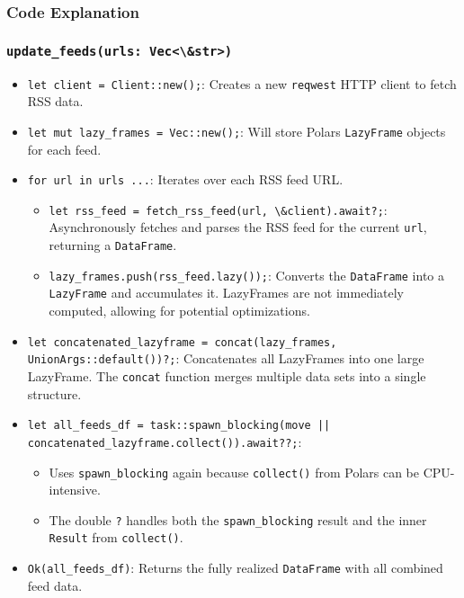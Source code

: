 \subsubsection{Code Explanation}
\subsubsection*{\lstinline{update_feeds(urls: Vec<\&str>)}}
\begin{itemize}
    \item \lstinline{let client = Client::new();}: Creates a new \lstinline{reqwest} HTTP client to fetch RSS data.
    \item \lstinline{let mut lazy_frames = Vec::new();}: Will store Polars \lstinline{LazyFrame} objects for each feed.
    \item \lstinline{for url in urls ...}: Iterates over each RSS feed URL.
        \begin{itemize}
            \item \lstinline{let rss_feed = fetch_rss_feed(url, \&client).await?;}: Asynchronously fetches and parses the RSS feed for the current \lstinline{url}, returning a \lstinline{DataFrame}.
            \item \lstinline{lazy_frames.push(rss_feed.lazy());}: Converts the \lstinline{DataFrame} into a \lstinline{LazyFrame} and accumulates it. LazyFrames are not immediately computed, allowing for potential optimizations.
        \end{itemize}
    \item \lstinline{let concatenated_lazyframe = concat(lazy_frames, UnionArgs::default())?;}: Concatenates all LazyFrames into one large LazyFrame. The \lstinline{concat} function merges multiple data sets into a single structure.
    \item \lstinline{let all_feeds_df = task::spawn_blocking(move || concatenated_lazyframe.collect()).await??;}: 
        \begin{itemize}
            \item Uses \lstinline{spawn_blocking} again because \lstinline{collect()} from Polars can be CPU-intensive.
            \item The double \lstinline{?} handles both the \lstinline{spawn_blocking} result and the inner \lstinline{Result} from \lstinline{collect()}.
        \end{itemize}
    \item \lstinline{Ok(all_feeds_df)}: Returns the fully realized \lstinline{DataFrame} with all combined feed data.
\end{itemize}

